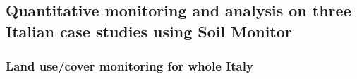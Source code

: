 \documentclass[APA,LATO1COL,doublespace]{WileyNJD-v2}
\begin{document}
\subsection{Quantitative monitoring and analysis on three Italian case studies using Soil Monitor}\label{sec:caseStudies}

\subsubsection{ Land use/cover monitoring for whole Italy } \label{sec:caseIT}
\end{document}
